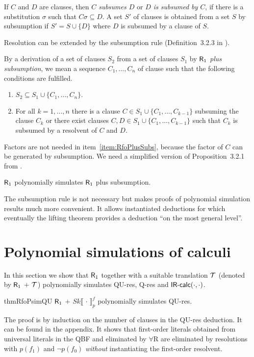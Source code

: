 \documentclass{llncs}
\newcommand{\qres}{\mbox{\sf Q-res}}
\newcommand{\qures}{\mbox{\sf QU-res}}
\newcommand{\ForallRed}{\mbox{\sf $\forall$R}}
\newcommand{\Rfo}{$\mbox{\sf R}_1$}
\newcommand{\IRcalcPM}[2]{$\mbox{\sf IR-calc}(#1,#2)$}
\newcommand{\caT}{{\cal T}}
\newcommand{\SkQBFtoPL}[3]{\mathit{Sk}\llbracket\,#1\,\rrbracket_{#2}^{#3}}
\begin{document}
\begin{definition}
If $C$ and $D$ are clauses, then \emph{$C$ subsumes $D$} or \emph{$D$
  is subsumed by $C$}, if there is a substitution $\sigma$ such that
$C\sigma \subseteq D$. A set $S'$ of clauses is obtained from a set
$S$ by subsumption if $S'=S\cup \{D\}$ where $D$ is subsumed by a
clause of $S$.
\end{definition}

Resolution can be extended by the subsumption rule
(Definition~3.2.3 in \cite{Eder:1992}). 
\begin{definition}
By a derivation of a set of clauses $S_2$ from a set of clauses $S_1$
by \emph{\Rfo{} plus subsumption}, we mean a sequence $C_1, \ldots ,
C_n$ of clause such that the following conditions are fulfilled.
\begin{enumerate}
\item $S_2 \subseteq S_1 \cup \{C_1, \ldots ,C_n\}$.
\item \label{item:RfoPlusSubs}
For all $k=1,\ldots , n$ there is a clause $C\in S_1 \cup \{C_1,
  \ldots ,C_{k-1}\}$ subsuming the clause $C_k$ or there exist clauses
  $C, D \in S_1 \cup \{C_1, \ldots ,C_{k-1}\}$ such that $C_k$ is
  subsumed by a resolvent of $C$ and $D$.
\end{enumerate}
\end{definition}
Factors are not needed in item~\ref{item:RfoPlusSubs}, because the
factor of $C$ can be generated by subsumption.  We need a simplified
version of Proposition~3.2.1 from \cite{Eder:1992}.

\begin{proposition}\label{prop:R1subs-psim-R1}
\Rfo{} polynomially simulates  \Rfo{} plus subsumption.
\end{proposition}
The subsumption rule is not necessary but makes proofs of polynomial
simulation results much more convenient.  It allows instantiated
deductions for which eventually the lifting theorem provides a
deduction ``on the most general level''.

\section{Polynomial simulations of calculi} 
\label{sec:poly-sim} 


In this section we show that \Rfo{} together with a suitable
translation $\caT$ (denoted by \Rfo{} $+$ $\caT$) polynomially
simulates \qures, \qres{} and \IRcalcPM{\cdot}{\cdot}.

\begin{restatable}{thm}{RfoPsimQU}
\label{thm:R1-psim-QUres}
\Rfo{} $+$ $\SkQBFtoPL{\cdot}{p}{f}$ polynomially
simulates \qures.
\end{restatable}
\noindent 
The proof is by induction on the number of clauses in the \qures{}
deduction. It can be found in the appendix. It shows that first-order
literals obtained from universal literals in the QBF and eliminated by
\ForallRed{} are eliminated by resolutions with $p(f_1)$ and $\neg
p(f_0)$ \emph{without} instantiating the first-order resolvent.
\end{document}
